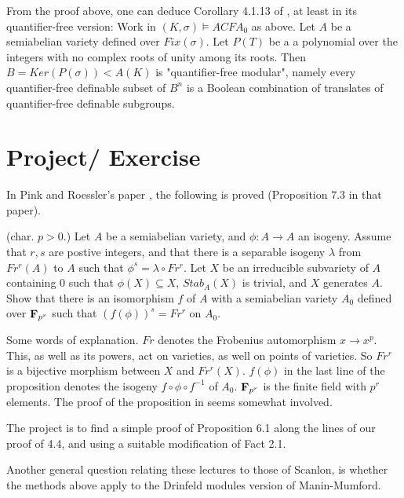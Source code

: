 \begin{Remark} From the proof
above, one can deduce Corollary 4.1.13 of
\cite{Hrushovski-MM}, at least in its
quantifier-free version: Work in
$(K,\sigma)\models ACFA_{0}$ as above. Let $A$
be a semiabelian variety defined over
$Fix(\sigma)$. Let $P(T)$ be a a polynomial
over the integers with no complex roots of
unity among its roots. Then $B =
Ker(P(\sigma))< A(K)$ is "quantifier-free
modular", namely every quantifier-free
definable subset of $B^{n}$ is a Boolean
combination of translates of quantifier-free
definable subgroups.
\end{Remark}

\section{Project/ Exercise}
In Pink and Roessler's paper
\cite{Pink-Roessler2}, the following is proved
(Proposition 7.3 in that paper).
\begin{Proposition} (char. $p > 0$.)
Let $A$ be a semiabelian variety, and
$\phi:A\rightarrow A$ an isogeny. Assume that
$r,s$ are postive integers, and that there is
a separable isogeny $\lambda$ from $Fr^{r}(A)$
to $A$ such that $\phi^{s} =
\lambda\circ Fr^{r}$. Let $X$ be an
irreducible subvariety of $A$ containing $0$
such that $\phi(X)\subseteq X$, $Stab_{A}(X)$
is trivial, and
$X$ generates $A$. Show that there is an
isomorphism $f$ of $A$ with a semiabelian
variety $A_{0}$ defined over ${\bf F}_{p^{r}}$
such that $(f(\phi))^{s} = Fr^{r}$ on $A_{0}$.
\end{Proposition}

Some words of explanation. $Fr$ denotes the
Frobenius automorphism $x\rightarrow x^{p}$.
This, as well as its powers, act on
varieties, as well on points of varieties. So
$Fr^{r}$ is a bijective morphism between $X$
and $Fr^{r}(X)$. $f(\phi)$ in the last line of
the proposition denotes the isogeny
$f\circ\phi\circ f^{-1}$ of
$A_{0}$. ${\bf F}_{p^{r}}$ is the finite field
with $p^{r}$ elements. The proof of the
proposition in \cite{Pink-Roessler2} seems
somewhat involved.

The project is to find a simple proof of
Proposition 6.1 along the lines of our proof of
4.4, and using a suitable modification of
Fact 2.1.

\vspace{5mm}
\noindent
Another general question relating these
lectures to those of Scanlon, is whether
the methods above apply to the Drinfeld modules
version of Manin-Mumford.







